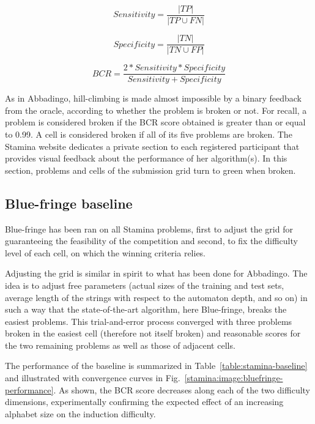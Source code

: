 $$Sensitivity=\frac{|TP|}{|TP \cup FN|}$$ 

$$Specificity=\frac{|TN|}{|TN \cup FP|}$$

$$BCR=\frac{2*Sensitivity*Specificity}{Sensitivity + Specificity}$$

As in Abbadingo, hill-climbing is made almost impossible by a binary feedback from the oracle, according to whether the problem is broken or not. For recall, a problem is considered broken if the BCR score obtained is greater than or equal to 0.99. A cell is considered broken if all of its five problems are broken. The Stamina website dedicates a private section to  each registered participant that provides visual feedback about the performance of her algorithm(s). In this section, problems and cells of the submission grid turn to green when broken.

\subsection{Blue-fringe baseline\label{subsection:stamina-baseline}}

Blue-fringe has been ran on all Stamina problems, first to adjust the grid for guaranteeing the feasibility of the competition and second, to fix the difficulty level of each cell, on which the winning criteria relies.

Adjusting the grid is similar in spirit to what has been done for Abbadingo. The idea is to adjust free parameters (actual sizes of the training and test sets, average length of the strings with respect to the automaton depth, and so on) in such a way that the state-of-the-art algorithm, here Blue-fringe, breaks the easiest problems. This trial-and-error process converged with three problems broken in the easiest cell (therefore not itself broken) and reasonable scores for the two remaining problems as well as those of adjacent cells.

The performance of the baseline is summarized in Table~\ref{table:stamina-baseline} and illustrated with convergence curves in Fig.~\ref{stamina:image:bluefringe-performance}. As shown, the BCR score decreases along each of the two difficulty dimensions, experimentally confirming the expected effect of an increasing alphabet size on the induction difficulty. 

